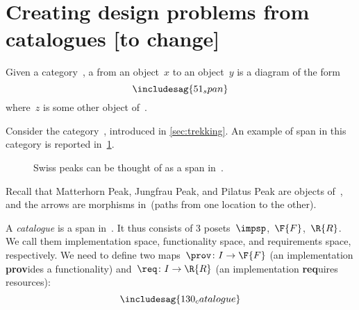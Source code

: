 

\section{Creating design problems from catalogues [to change]}
\label{sec:spans}

\begin{ctdefinition}[Span]
    \label{def:span}
    Given a category~\CatC, a \emph{} from an object~$x$ to an object~$y$ is a diagram of the form
    \begin{equation}
        \includesag{51_span}
    \end{equation}
    where~$z$ is some other object of~\CatC.
\end{ctdefinition}

\begin{example}
    Consider the category~\Berg, introduced in \cref{sec:trekking}. An example of span in this category is reported in~\cref{fig:exmountains}.
    \begin{figure}[h!]
        \begin{center}
        \end{center}
        \caption{Swiss peaks can be thought of as a span in~\Trek. \label{fig:exmountains}}
    \end{figure}
    Recall that \textsf{Matterhorn Peak}, \textsf{Jungfrau Peak}, and \textsf{Pilatus Peak} are objects of~\Trek, and the arrows are morphisms in~\Trek (paths from one location to the other).
\end{example}

\begin{definition}[Catalogue]\label{def:catalogue}
    A \emph{catalogue} is a span in~\Pos.
    It thus consists of 3 posets~$\impsp$,~$\F{F}$,~$\R{R}$.
    We call them implementation space, functionality space, and requirements space, respectively. We need to define two maps~$\prov \colon I \to \F{F}$ (an implementation \textbf{prov}ides a functionality) and~$\req\colon I \to \R{R}$ (an implementation \textbf{req}uires resources):
    \begin{equation*}
        \includesag{130_catalogue}
    \end{equation*}
\end{definition}

